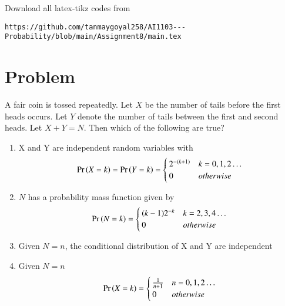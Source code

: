 \documentclass[journal,12pt,twocolumn]{IEEEtran}
\begin{document}
%
Download all latex-tikz codes from 
%
\begin{lstlisting}
https://github.com/tanmaygoyal258/AI1103---Probability/blob/main/Assignment8/main.tex
\end{lstlisting}
\section{Problem}
A fair coin is tossed repeatedly. Let $X$ be the number of tails before the first heads occurs. Let $Y$ denote the number of tails between the first and second heads. Let $X+Y = N$. Then which of the following are true?\\
\begin{enumerate}
    \item X and Y are independent random variables with
    {\footnotesize
    \begin{align}
        \Pr\left(X = k\right) = \Pr\left(Y = k\right) =
        \begin{cases}
            2^{-(k+1)} & k=0,1,2 \ldots
            \\
            0 & otherwise
        \end{cases}
    \end{align}
    }
    \item $N$ has a probability mass function given by
    {\small
     \begin{align}
        \Pr\left(N = k\right) =
        \begin{cases}
            (k-1)2^{-k} & k=2,3,4 \ldots
            \\
            0 & otherwise
        \end{cases}
    \end{align}
    }
    \item Given $N = n$, the conditional distribution of X and Y are independent

    \item Given $N = n$
     \begin{align}
        \Pr\left(X = k\right) =
        \begin{cases}
            \frac{1}{n+1} & n=0,1,2 \ldots
            \\
            0 & otherwise
        \end{cases}
    \end{align}
\end{enumerate}
\end{document}
